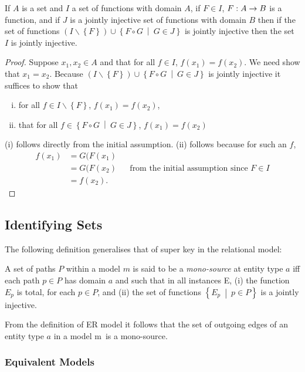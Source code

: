 \documentclass[10pt,a4paper]{article}
\newcommand{\setsuchthat}[2]{\left\{#1 \ \middle|\ #2\right\}}
\newcommand{\set}[1]{\left\{#1\right\}}
\newcommand{\genericmodel}{\mathcal{M}}
\renewcommand{\genericmodel}{{m}}
\newcommand{\term}[1]{\textit{{#1}}}
\begin{document}
\begin{lemma}
\label{jointlyinjectivefactorisation}
If $A$ is a set and $I$  a set of functions with domain $A$, if $F \in I$, $F: A \rightarrow B$ is a function,
and if $J$ is a jointly injective set of functions with domain $B$ then if the set of functions
$(I \backslash \set{F}) \cup \setsuchthat{F \circ G}{G \in J}$ is jointly injective then the
set $I$ is jointly injective.
\end{lemma}
\begin{proof}
Suppose $x_1,x_2 \in A$ and that for all $f \in I$, $f(x_1)=f(x_2)$. We need show that $x_1=x_2$.
Because $(I \backslash \set{F}) \cup \setsuchthat{F \circ G}{G \in J}$ is jointly injective
it suffices to show that 
\begin{enumerate}[(i)]
\item
for all $f \in I \backslash \set{F}$, $f(x_1)=f(x_2)$, 
\item that for all $f \in \setsuchthat{F \circ G}{G \in J}$, $f(x_1)=f(x_2)$
\end{enumerate}
(i) follows directly from the initial assumption. 
(ii) follows because for such an $f$, 
\begin{align*}
f(x_1)&=G(F(x_1) & & \\
      &=G(F(x_2) & & \mbox{from the initial assumption since }F \in I \\
			&=f(x_2). & &
\end{align*}
\end{proof}


\subsection{Identifying Sets}

The following definition generalises that of super key in the relational model:
\begin{definition}
A set of paths $P$  within a model $\genericmodel$ is said to be a \term{mono-source} at entity type $a$
iff each path $p \in P$ has domain $a$ and such that in all instances E, 
(i) the function $E_p$ is total, for each $p \in P$, and (ii) the set of functions
$\setsuchthat{E_p}{p\in P}$ is a jointly injective.
\end{definition}

From the definition of ER model it follows that the set of outgoing edges of an entity type 
$a$ in a model \genericmodel\ is a mono-source. 

\subsubsection{Equivalent Models}
\end{document}
